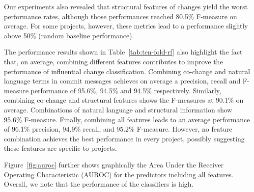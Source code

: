 Our experiments also revealed that structural features of changes yield the
worst performance rates, although those performances reached 80.5\%
F-measure on average. For some projects, however, these metrics lead to a
performance slightly above 50\% (random baseline performance).


The performance results shown in Table~\ref{tab:ten-fold-rf} also highlight
the fact that, on average, combining different features contributes to improve
the performance of influential change classification. Combining co-change and
natural language terms in commit messages achieves on average a precision, recall and
F-measure performance of 95.6\%, 94.5\% and 94.5\% respectively.
Similarly, combining co-change and structural features shows the F-measures at
90.1\% on average. Combinations of natural language and structural information
show 95.6\% F-measure. Finally, combining all features leads to an average
performance of 96.1\% precision, 94.9\% recall, and 95.2\% F-measure. However,
no feature combination achieves the best performance in every project, possibly
suggesting these features are specific to projects.

Figure~\ref{fig:auroc} further shows graphically the Area Under the Receiver Operating Characteristic (AUROC) for the predictors including all features. Overall, we note that the performance of the classifiers is high.

